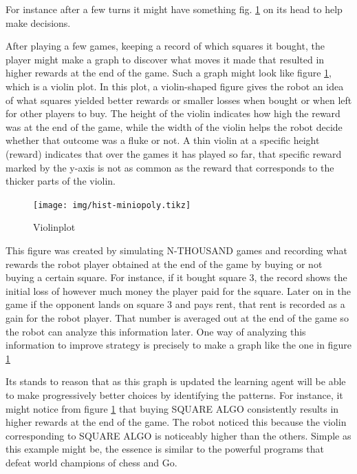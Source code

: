 For instance after a few turns it might have something fig. 
\ref{fig:hist-miniopoly} on its head to help make decisions.

After playing a few games, keeping a record of which squares it 
bought, the player might make a graph to discover what moves it 
made that resulted in higher rewards at the end of the game. 
Such a graph might look like figure \ref{fig:hist-miniopoly}, 
which is a violin plot. In this plot, a violin-shaped figure 
gives the robot an idea of what squares yielded better rewards 
or smaller losses when bought or when left for other players to 
buy. The height of the violin indicates how high the reward was 
at the end of the game, while the width of the violin helps the 
robot decide whether that outcome was a fluke or not. A thin 
violin at a specific height (reward) indicates that over the 
games it has played so far, that specific reward marked by the 
y-axis is not as common as the reward that corresponds to the 
thicker parts of the violin.

\begin{figure}
\centering
\texttt{[image: img/hist-miniopoly.tikz]}
\label{fig:hist-miniopoly}
\caption{Violinplot}
\end{figure}

This figure was created by simulating N-THOUSAND games and 
recording what rewards the robot player obtained at the end of 
the game by buying or not buying a certain square. For 
instance, if it bought square 3, the record shows the initial 
loss of however much money the player paid for the square. 
Later on in the game if the opponent lands on square 3 and pays 
rent, that rent is recorded as a gain for the robot player. 
That number is averaged out at the end of the game so the robot 
can analyze this information later. One way of analyzing this 
information to improve strategy is precisely to make a graph 
like the one in figure \ref{fig:hist-miniopoly}

Its stands to reason that as this graph is updated the learning 
agent will be able to make progressively better choices by 
identifying the patterns. For instance, it might notice from 
figure \ref{fig:hist-miniopoly} that buying SQUARE ALGO 
consistently results in higher rewards at the end of the game. 
The robot noticed this because the violin corresponding to 
SQUARE ALGO is noticeably higher than the others. Simple as 
this example might be, the essence is similar to the powerful 
programs that defeat world champions of chess and Go.

